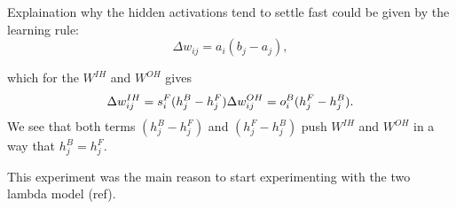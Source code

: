 Explaination why the hidden activations tend to settle fast could be given by the learning rule: 
\begin{equation} 
\Delta w_{ij} = a_i(b_j - a_j),
\end{equation} 

which for the $W^{IH}$ and $W^{OH}$ gives
\begin{equation} 
\Delta w_{ij}^{IH} = s^F_i(h^B_j - h^F_j) \\ 
\Delta w_{ij}^{OH} = o^B_i(h^F_j - h^B_j). 
\end{equation} 
We see that both terms $(h^B_j - h^F_j)$ and $(h^F_j - h^B_j)$ push $W^{IH}$ and $W^{OH}$ in a way that $h^B_j = h^F_j$. 

This experiment was the main reason to start experimenting with the two lambda model (ref). 







